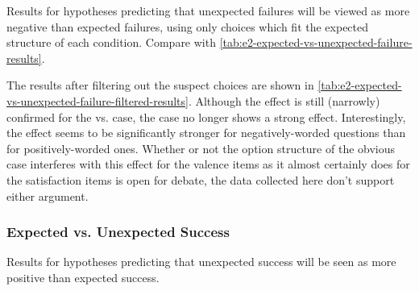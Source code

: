 \begin{table}[!b]
\centering
\bgroup
\def\arraystretch{1.3}
\setlength{\tabcolsep}{0.6em}

\egroup
\caption[Retrospective expected vs\@. unexpected failure results revisited]{Results for hypotheses predicting that unexpected failures will be viewed as more negative than expected failures, using only choices which fit the expected structure of each condition. Compare with \cref{tab:e2-expected-vs-unexpected-failure-results}.}
  \label{tab:e2-expected-vs-unexpected-failure-filtered-results}
\end{table}


The results after filtering out the suspect choices are shown in \cref{tab:e2-expected-vs-unexpected-failure-filtered-results}.
%
Although the effect is still (narrowly) confirmed for the \expf{} vs\@. \unxf{} case, the \obvfm{} case no longer shows a strong effect.
%
Interestingly, the effect seems to be significantly stronger for negatively-worded questions than for positively-worded ones.
%
Whether or not the option structure of the obvious case interferes with this effect for the valence items as it almost certainly does for the satisfaction items is open for debate, the data collected here don't support either argument.


\subsubsection{Expected vs\@. Unexpected Success}

\begin{table}[!b]
\centering
\bgroup
\def\arraystretch{1.3}
\setlength{\tabcolsep}{0.6em}

\egroup
\caption[Retrospective expected vs\@. unexpected success results]{Results for hypotheses predicting that unexpected success will be seen as more positive than expected success.}
  \label{tab:e2-expected-vs-unexpected-success-results}
\end{table}

